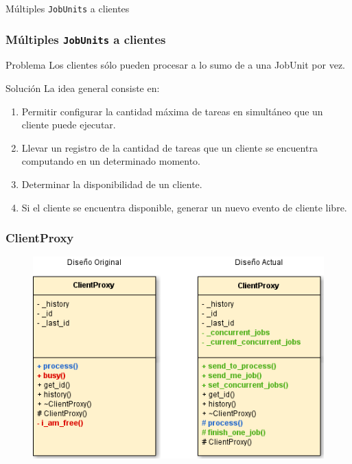 \begin{subsection}{Múltiples \texttt{JobUnits} a clientes}

	\begin{frame}\frametitle{Múltiples \texttt{JobUnits} a clientes}
		\begin{block}{Problema}
			Los clientes sólo pueden procesar a lo sumo de a una JobUnit por vez.
		\end{block}
		\pause
		\begin{block}{Solución}
			La idea general consiste en:
			\begin{enumerate}\addtolength{\itemsep}{2mm}
				\item Permitir configurar la cantidad máxima de tareas en simultáneo que un cliente puede ejecutar. \pause
				\item Llevar un registro de la cantidad de tareas que un cliente se encuentra computando en un determinado momento.\pause
				\item Determinar la disponibilidad de un cliente.\pause
				\item Si el cliente se encuentra disponible, generar un nuevo evento de cliente libre.
			\end{enumerate}
		\end{block}
	\end{frame}

	\begin{frame}\frametitle{ClientProxy}
		\begin{figure}
      		\includegraphics[scale=0.5]{images/ClientProxy-orig-vs-actual.png}
      	\end{figure}
	\end{frame}


\end{subsection}
